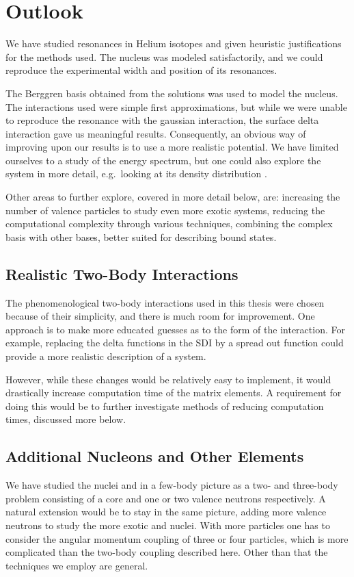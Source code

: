\documentclass[../main/report.tex]{subfiles}
\begin{document}
\chapter{Outlook}
\label{cha:outlook}

We have studied resonances in Helium isotopes and given heuristic justifications for the methods used. The  nucleus was modeled satisfactorily, and we could reproduce the experimental width and position of its resonances.

The Berggren basis obtained from the  solutions was used to model the  nucleus. The interactions used were simple first approximations, but while we were unable to reproduce the  resonance with the gaussian interaction, the surface delta interaction gave us meaningful results.
Consequently, an obvious way of improving upon our results is to use a more realistic potential. 
We have limited ourselves to a study of the energy spectrum, but one could also explore the  system in more detail, e.g.~looking at its density distribution \cite{radii}.

Other areas to further explore, covered in more detail below, are: increasing the number of valence particles to study even more exotic systems, reducing the computational complexity through various techniques, combining the complex basis with other bases, better suited for describing bound states.

\section{Realistic Two-Body Interactions}
The phenomenological two-body interactions used in this thesis were chosen because of their simplicity, and there is much room for improvement. 
One approach is to make more educated guesses as to the form of the interaction. 
For example, replacing the delta functions in the SDI by a spread out function could provide a more realistic description of a system. 

However, while these changes would be relatively easy to implement, it would drastically increase computation time of the matrix elements. 
A requirement for doing this would be to further investigate methods of reducing computation times, discussed more below.  

\section{Additional Nucleons and Other Elements}
We have studied the nuclei  and  in a few-body picture as a two- and three-body problem consisting of a core and one or two valence neutrons respectively.
A natural extension would be to stay in the same picture, adding more valence neutrons to study the more exotic  and  nuclei.
With more particles one has to consider the angular momentum coupling of three or four particles, which is more complicated than the two-body coupling described here. Other than that the techniques we employ are general.
\end{document}
